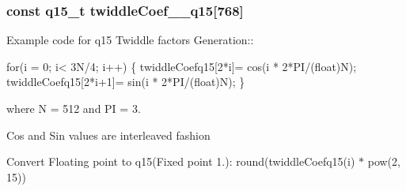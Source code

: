 \subsubsection[{\texorpdfstring{twiddle\+Coef\+\_\+512\+\_\+q15}{twiddleCoef_512_q15}}]{\setlength{\rightskip}{0pt plus 5cm}const q15\+\_\+t twiddle\+Coef\+\_\+\_\+q15\mbox{[}768\mbox{]}}\hypertarget{group__CFFT__CIFFT_ga6152621af210f847128c6f38958fa385}{}\label{group__CFFT__CIFFT_ga6152621af210f847128c6f38958fa385}
\begin{DoxyParagraph}{}
Example code for q15 Twiddle factors Generation\+:\+: 
\end{DoxyParagraph}
\begin{DoxyParagraph}{}

\begin{DoxyPre}for(i = 0; i< 3N/4; i++)
\{
   twiddleCoefq15[2*i]= cos(i * 2*PI/(float)N);
   twiddleCoefq15[2*i+1]= sin(i * 2*PI/(float)N);
\} \end{DoxyPre}
 
\end{DoxyParagraph}
\begin{DoxyParagraph}{}
where N = 512 and PI = 3. 
\end{DoxyParagraph}
\begin{DoxyParagraph}{}
Cos and Sin values are interleaved fashion 
\end{DoxyParagraph}
\begin{DoxyParagraph}{}
Convert Floating point to q15(Fixed point 1.)\+: round(twiddle\+Coefq15(i) $\ast$ pow(2, 15)) 
\end{DoxyParagraph}
